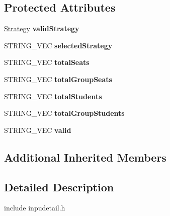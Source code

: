 \subsection*{Protected Attributes}
\begin{DoxyCompactItemize}
\item 
\hypertarget{classValidStrategy_aac23ca61c16d79b48603a7db96617003}{\hyperlink{classStrategy}{Strategy} {\bfseries valid\-Strategy}}\label{classValidStrategy_aac23ca61c16d79b48603a7db96617003}

\item 
\hypertarget{classValidStrategy_a0400bdc1d25df2a613d50ed02c537eb2}{S\-T\-R\-I\-N\-G\-\_\-\-V\-E\-C {\bfseries selected\-Strategy}}\label{classValidStrategy_a0400bdc1d25df2a613d50ed02c537eb2}

\item 
\hypertarget{classValidStrategy_ad34fa679672d7685af9678e6c579e800}{S\-T\-R\-I\-N\-G\-\_\-\-V\-E\-C {\bfseries total\-Seats}}\label{classValidStrategy_ad34fa679672d7685af9678e6c579e800}

\item 
\hypertarget{classValidStrategy_a7344a7cf32192fa494ed9dd6784c509e}{S\-T\-R\-I\-N\-G\-\_\-\-V\-E\-C {\bfseries total\-Group\-Seats}}\label{classValidStrategy_a7344a7cf32192fa494ed9dd6784c509e}

\item 
\hypertarget{classValidStrategy_a4d0e361e6ed28a83332bebf66ab018e2}{S\-T\-R\-I\-N\-G\-\_\-\-V\-E\-C {\bfseries total\-Students}}\label{classValidStrategy_a4d0e361e6ed28a83332bebf66ab018e2}

\item 
\hypertarget{classValidStrategy_a4d947570307ce9d87d35f699ee10cae6}{S\-T\-R\-I\-N\-G\-\_\-\-V\-E\-C {\bfseries total\-Group\-Students}}\label{classValidStrategy_a4d947570307ce9d87d35f699ee10cae6}

\item 
\hypertarget{classValidStrategy_a66d7ba02a423a08f4f0af7c714787e76}{S\-T\-R\-I\-N\-G\-\_\-\-V\-E\-C {\bfseries valid}}\label{classValidStrategy_a66d7ba02a423a08f4f0af7c714787e76}

\end{DoxyCompactItemize}
\subsection*{Additional Inherited Members}


\subsection{Detailed Description}
include inpudetail.\-h 

